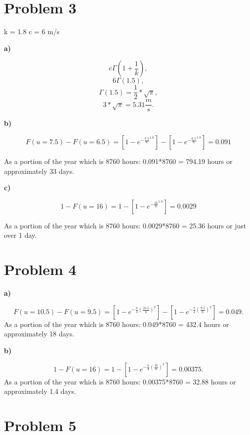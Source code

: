 \documentclass[11pt]{article}
\author(Conor Redington}
\begin{document}
\maketitle



\section{Problem 3}

k = 1.8
c = 6 m/s


\textbf{a)}

\[
    c\Gamma\left( 1 + \frac{1}{k} \right) 
,\] 
\[
    6\Gamma(1.5) 
,\] 
\[
\Gamma\left( 1.5 \right) = \frac{1}{2} * \sqrt{\pi} 
,\] 
\[
3*\sqrt{\pi}  = 5.31 \frac{m}{s}
.\] 

\textbf{b)}

\[

    F(u = 7.5) - F(u = 6.5) = [1- e^{-\frac{7.5}{6}^{1.8}}] - [1-
    e^{-\frac{6.5}{6}^{1.8}}] = 0.091

\]

As a portion of the year which is 8760 hours: 0.091*8760 = 794.19 hours or
approximately 33 days.

\textbf{c)}

\[

    1 - F(u = 16)= 1 - [1- e^{-\frac{16}{6}^{1.8}}] = 0.0029
\]

As a portion of the year which is 8760 hours: 0.0029*8760 = 25.36 hours or just
over 1 day.

\section{Problem 4}

\textbf{a)}

\[
    F(u = 10.5) - F(u = 9.5) = [1- e^{-\frac{\pi}{4}\left(
        \frac{10.5}{6}\right)^2}] - [1- e^{-\frac{\pi}{4}\left(
\frac{9.5}{6}\right)^2}] = 0.049
.\] 
As a portion of the year which is 8760 hours: 0.049*8760 = 432.4 hours or
approximately 18 days.



\textbf{b)}

\[
    1 - F(u = 16) = 1 - [1 - e^{-\frac{\pi}{4}\left( \frac{16}{6}\right)^2}] =
    0.00375
.\] 
As a portion of the year which is 8760 hours: 0.00375*8760 = 32.88 hours or
approximately 1.4 days.

\section{Problem 5}
\end{document}
